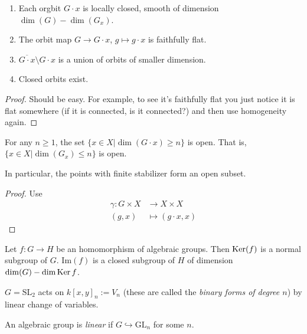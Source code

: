 \begin{proposition}
\label{proposition-properties-of-orbit}
\begin{enumerate}
\item Each orgbit $G\cdot x$ is locally closed, smooth of dimension
$\dim(G)-\dim(G_x)$.
\item The orbit map $G \to G\cdot x$, $g \mapsto  g\cdot x$ is faithfully flat.
\item $\overline{G\cdot x}\setminus G\cdot x$ is a union of orbits of smaller
dimension.
\item Closed orbits exist.
\end{enumerate}
\end{proposition}

\begin{proof}
Should be easy.
For example, to see it's faithfully flat you just notice it is flat somewhere
(if it is connected, is it connected?) and then use homogeneity again.
\end{proof}

\begin{proposition}
\label{proposition-bound-on-dimension-of-orbit-gives-open-set}
For any $n \geq 1$, the set $\{x \in X|\dim(G\cdot x)\geq n\}$ is open. That is,
$\{x \in X|\dim(G_x)\leq n\}$ is open.

In particular, the points with finite stabilizer form an open subset.
\end{proposition}

\begin{proof}
Use
\begin{align*}
\gamma: G \times X &\longrightarrow X\times X \\
(g,x) &\longmapsto (g\cdot x,x)
\end{align*}
\end{proof}

\begin{lemma}
\label{lemma-homomorphism-of-algebraic-groups}
Let $f:G \to H$ be an homomorphism of algebraic groups. Then $\mathop{\mathrm{Ker}} (f)$ is a
normal subgroup of $G$. $\text{Im}(f)$ is a
closed subgroup of $H$ of dimension $\dim(G)-\dim \mathop{\mathrm{Ker}} f$.
\end{lemma}

\begin{example}
\label{example-}
$G=\text{SL}_2$ acts on $k[x,y]_n:=V_n$ (these are called the {\it binary forms 
of degree $n$}) by linear change of variables.
\end{example}

\begin{definition}
\label{definition-linear-algebraic-group}
An algebraic group is {\it linear} if $G \hookrightarrow \text{GL}_n$ for some
$n$.
\end{definition}

